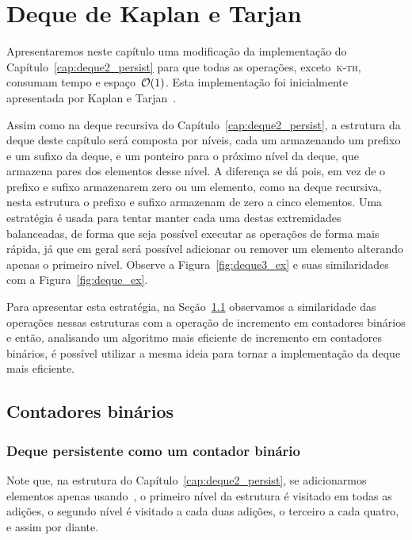 \documentclass[../../main.tex]{subfiles}
\begin{document}
\chapter{Deque de Kaplan e Tarjan} \label{cap:deque3_persist}

Apresentaremos neste capítulo uma modificação da implementação do Capítulo~\ref{cap:deque2_persist} para que todas as operações, exceto~\textsc{k-th}, consumam tempo e espaço~$\mathcal{O}(1)$. Esta implementação foi inicialmente apresentada por Kaplan e Tarjan~\cite{KaplanT1999}.

Assim como na deque recursiva do Capítulo~\ref{cap:deque2_persist}, a estrutura da deque deste capítulo será composta por níveis, cada um armazenando um prefixo e um sufixo da deque, e um ponteiro para o próximo nível da deque, que armazena pares dos elementos desse nível. A diferença se dá pois, em vez de o prefixo e sufixo armazenarem zero ou um elemento, como na deque recursiva, nesta estrutura o prefixo e sufixo armazenam de zero a cinco elementos. Uma estratégia é usada para tentar manter cada uma destas extremidades balanceadas, de forma que seja possível executar as operações de forma mais rápida, já que em geral será possível adicionar ou remover um elemento alterando apenas o primeiro nível. Observe a Figura~\ref{fig:deque3_ex} e suas similaridades com a Figura~\ref{fig:deque_ex}.

Para apresentar esta estratégia, na Seção~\ref{sec:contbin} observamos a similaridade das operações nessas estruturas com a operação de incremento em contadores binários e então, analisando um algoritmo mais eficiente de incremento em contadores binários, é possível utilizar a mesma ideia para tornar a implementação da deque mais eficiente.

\section{Contadores binários} \label{sec:contbin}

\subsection{Deque persistente como um contador binário} \label{subsec:contbin_simples}

Note que, na estrutura do Capítulo~\ref{cap:deque2_persist}, se adicionarmos elementos apenas usando~, o primeiro nível da estrutura é visitado em todas as adições, o segundo nível é visitado a cada duas adições, o terceiro a cada quatro, e assim por diante.
\end{document}
